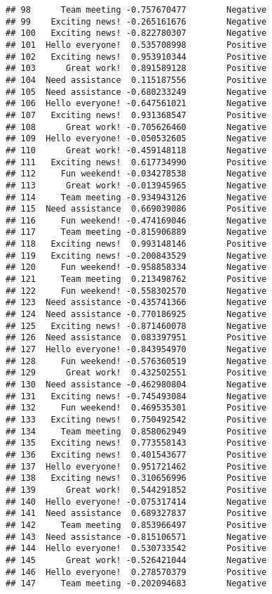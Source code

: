 \documentclass[
]{article}
\begin{document}
\begin{verbatim}
## 98      Team meeting -0.757670477        Negative
## 99    Exciting news! -0.265161676        Negative
## 100   Exciting news! -0.822780307        Negative
## 101  Hello everyone!  0.535708998        Positive
## 102   Exciting news!  0.953910344        Positive
## 103      Great work!  0.891589128        Positive
## 104  Need assistance  0.115187556        Positive
## 105  Need assistance -0.680233249        Negative
## 106  Hello everyone! -0.647561021        Negative
## 107   Exciting news!  0.931368547        Positive
## 108      Great work! -0.705626460        Negative
## 109  Hello everyone! -0.050532605        Negative
## 110      Great work! -0.459148118        Negative
## 111   Exciting news!  0.617734990        Positive
## 112     Fun weekend! -0.034278538        Negative
## 113      Great work! -0.013945965        Negative
## 114     Team meeting -0.934943126        Negative
## 115  Need assistance  0.669039086        Positive
## 116     Fun weekend! -0.474169046        Negative
## 117     Team meeting -0.815906889        Negative
## 118   Exciting news!  0.993148146        Positive
## 119   Exciting news! -0.200843529        Negative
## 120     Fun weekend! -0.958858334        Negative
## 121     Team meeting  0.213498762        Positive
## 122     Fun weekend! -0.558302570        Negative
## 123  Need assistance -0.435741366        Negative
## 124  Need assistance -0.770186925        Negative
## 125   Exciting news! -0.871460078        Negative
## 126  Need assistance  0.083397951        Positive
## 127  Hello everyone! -0.843954970        Negative
## 128     Fun weekend! -0.576360519        Negative
## 129      Great work!  0.432502551        Positive
## 130  Need assistance -0.462980804        Negative
## 131   Exciting news! -0.745493084        Negative
## 132     Fun weekend!  0.469535301        Positive
## 133   Exciting news!  0.750492542        Positive
## 134     Team meeting  0.858062949        Positive
## 135   Exciting news!  0.773558143        Positive
## 136   Exciting news!  0.401543677        Positive
## 137  Hello everyone!  0.951721462        Positive
## 138   Exciting news!  0.310656996        Positive
## 139      Great work!  0.544291852        Positive
## 140  Hello everyone! -0.075317414        Negative
## 141  Need assistance  0.689327837        Positive
## 142     Team meeting  0.853966497        Positive
## 143  Need assistance -0.815106571        Negative
## 144  Hello everyone!  0.530733542        Positive
## 145      Great work! -0.526421044        Negative
## 146  Hello everyone!  0.278570379        Positive
## 147     Team meeting -0.202094683        Negative

\end{verbatim}
\end{document}
